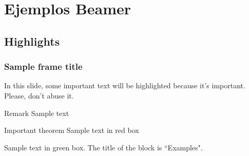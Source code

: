 \documentclass{beamer}
\begin{document}
\section{Ejemplos Beamer}

\subsection{Highlights}

\begin{frame}
  \frametitle{Sample frame title}

  In this slide, some important text will be
  \alert{highlighted} because it's important.
  Please, don't abuse it.

  \begin{block}{Remark}
  Sample text
  \end{block}

  \begin{alertblock}{Important theorem}
  Sample text in red box
  \end{alertblock}

  \begin{examples}
  Sample text in green box. The title of the block is ``Examples".
  \end{examples}
\end{frame}
\end{document}
